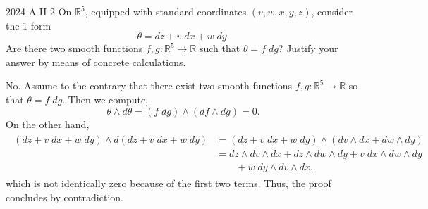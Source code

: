 \documentclass{article}
\begin{document}
	\begin{prb}{2024-A-II-2}
		On $\mathbb{R}^{5}$, equipped with standard coordinates $(v, w, x, y, z)$, consider the 1-form 
		\begin{equation*}
			\theta = dz + v\;dx + w\;dy. 
		\end{equation*}
		Are there two smooth functions $f, g: \mathbb{R}^{5} \to \mathbb{R}$ such that $\theta = f\;dg$? Justify your answer by means of concrete calculations. 
	\end{prb}
	No. Assume to the contrary that there exist two smooth functions $f, g: \mathbb{R}^{5} \to \mathbb{R}$ so that $\theta = f\;dg$. Then we compute, 
	\begin{equation*}
		\theta \wedge d\theta = (f\;dg) \wedge (df \wedge dg) = 0. 
	\end{equation*}
	On the other hand, 
	\begin{align*}
		\begin{split}
			(dz + v\;dx + w\;dy) \wedge d(dz + v\;dx + w\;dy) &= (dz + v\;dx + w\;dy) \wedge (dv\wedge dx + dw\wedge dy) \\
			&= dz\wedge dv \wedge dx + dz \wedge dw \wedge dy + v\;dx \wedge dw \wedge dy \\
			&\qquad + w\;dy \wedge dv \wedge dx, 
		\end{split}
	\end{align*}
	which is not identically zero because of the first two terms. Thus, the proof concludes by contradiction. 
	
\end{document}
